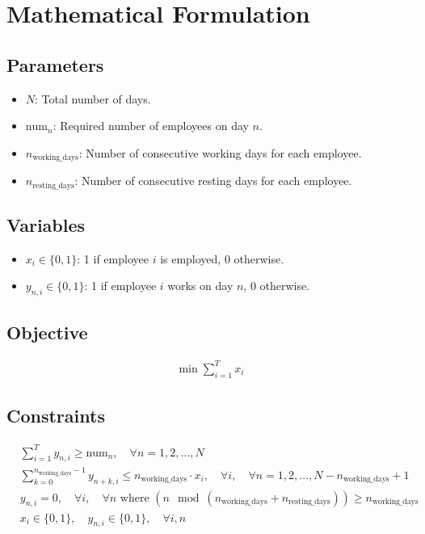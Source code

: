 \documentclass{article}
\begin{document}
\section*{Mathematical Formulation}

\subsection*{Parameters}
\begin{itemize}
    \item \( N \): Total number of days.
    \item \(\text{num}_{n}\): Required number of employees on day \( n \).
    \item \( n_{\text{working\_days}} \): Number of consecutive working days for each employee.
    \item \( n_{\text{resting\_days}} \): Number of consecutive resting days for each employee.
\end{itemize}

\subsection*{Variables}
\begin{itemize}
    \item \( x_i \in \{0, 1\} \): 1 if employee \( i \) is employed, 0 otherwise.
    \item \( y_{n,i} \in \{0, 1\} \): 1 if employee \( i \) works on day \( n \), 0 otherwise.
\end{itemize}

\subsection*{Objective}
\begin{align*}
    \min \sum_{i=1}^{T} x_i
\end{align*}

\subsection*{Constraints}

\begin{align*}
    &\sum_{i=1}^{T} y_{n,i} \geq \text{num}_{n}, \quad \forall n = 1, 2, \ldots, N \\
    &\sum_{k=0}^{n_{\text{working\_days}} - 1} y_{n+k,i} \leq n_{\text{working\_days}} \cdot x_i, \quad \forall i, \quad \forall n = 1, 2, \ldots, N - n_{\text{working\_days}} + 1 \\
    &y_{n,i} = 0, \quad \forall i, \quad \forall n \text{ where } (n \mod (n_{\text{working\_days}} + n_{\text{resting\_days}})) \geq n_{\text{working\_days}} \\
    &x_i \in \{0, 1\}, \quad y_{n,i} \in \{0, 1\}, \quad \forall i, n
\end{align*}
\end{document}
